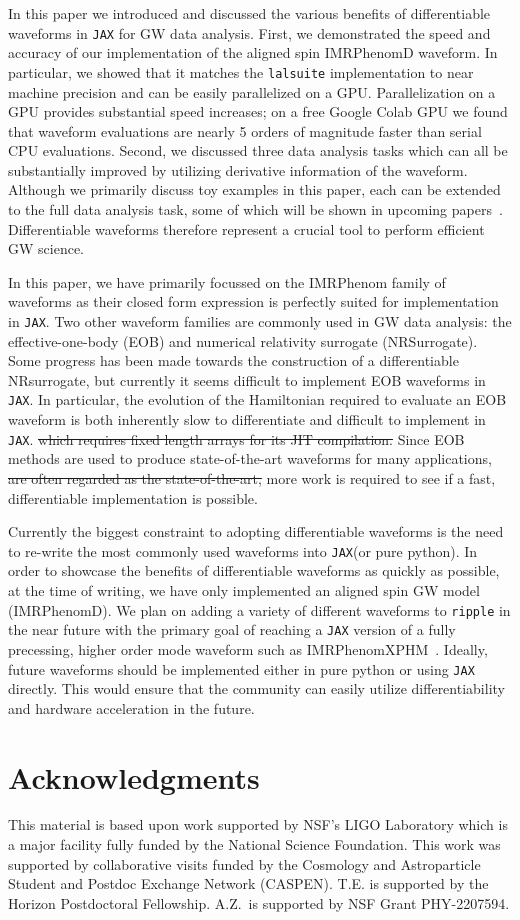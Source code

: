 \documentclass[twocolumn]{aastex631}
\newcommand{\jax}{\texttt{JAX}\xspace}
\newcommand{\ripple}{\texttt{ripple}\xspace}
\newcommand{\lalsuite}{\texttt{lalsuite}\xspace}
\begin{document}
In this paper we introduced and discussed the various benefits of differentiable waveforms in \jax for GW data analysis.
First, we demonstrated the speed and accuracy of our implementation of the aligned spin IMRPhenomD waveform.
In particular, we showed that it matches the \lalsuite implementation to near machine precision and can be easily parallelized on a GPU.
Parallelization on a GPU provides substantial speed increases; on a free Google Colab GPU we found that waveform evaluations are nearly 5 orders of magnitude faster than serial CPU evaluations.
Second, we discussed three data analysis tasks which can all be substantially improved by utilizing derivative information of the waveform.
Although we primarily discuss toy examples in this paper, each can be extended to the full data analysis task, some of which will be shown in upcoming papers~\citep{PEpaper}.
Differentiable waveforms therefore represent a crucial tool to perform efficient GW science.

In this paper, we have primarily focussed on the IMRPhenom family of waveforms as their closed form expression is perfectly suited for implementation in \jax.
Two other waveform families are commonly used in GW data analysis: the effective-one-body (EOB) and numerical relativity surrogate (NRSurrogate). 
Some progress has been made towards the construction of a differentiable NRsurrogate, but currently it seems difficult to implement EOB waveforms in \jax.
In particular, the evolution of the Hamiltonian required to evaluate an EOB waveform is both inherently slow to differentiate and difficult to implement in \jax. 
\sout{which requires fixed length arrays for its JIT compilation.}
Since EOB methods are used to produce state-of-the-art waveforms for many applications,
\sout{are often regarded as the state-of-the-art,} 
more work is required to see if a fast, differentiable implementation is possible.

Currently the biggest constraint to adopting differentiable waveforms is the need to re-write the most commonly used waveforms into \jax (or pure python).
In order to showcase the benefits of differentiable waveforms as quickly as possible, at the time of writing, we have only implemented an aligned spin GW model (IMRPhenomD).
We plan on adding a variety of different waveforms to \ripple in the near future with the primary goal of reaching a \jax version of a fully precessing, higher order mode waveform such as IMRPhenomXPHM~\citep{Pratten:2020ceb}.
Ideally, future waveforms should be implemented either in pure python or using \jax directly.
This would ensure that the community can easily utilize differentiability and hardware acceleration in the future.


\section{Acknowledgments}
This material is based upon work supported by NSF's LIGO Laboratory which is a major facility fully funded by the National Science Foundation.
This work was supported by collaborative visits funded by the Cosmology and Astroparticle Student and Postdoc Exchange Network (CASPEN). 
T.E. is supported by the Horizon Postdoctoral Fellowship.
A.Z.~is supported by NSF Grant PHY-2207594.


\end{document}
